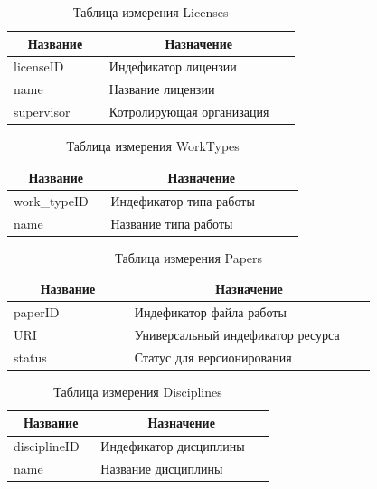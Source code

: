 \documentclass[a4paper,14pt]{extarticle}
\newcommand{\heading}[1]{\multicolumn{1}{|c|}{\textbf{#1}}}
\begin{document}
\begin{table}[htbp]
	\caption{Таблица измерения Licenses}
	\begin{tabular}{|p{0.3\linewidth}|p{0.6\linewidth}|}
		\hline
		\heading{Название} & \heading{Назначение} \\ \hline
		licenseID & Индефикатор лицензии \\ \hline
		name & Название лицензии \\ \hline
		supervisor & Котролирующая организация \\ \hline
	\end{tabular}
	\label{tab:licenses}
\end{table}


\begin{table}[htbp]
\caption{Таблица измерения WorkTypes}
\begin{tabular}{|p{0.3\linewidth}|p{0.6\linewidth}|}
	\hline
	\heading{Название} & \heading{Назначение} \\ \hline
		work\_typeID & Индефикатор типа работы \\ \hline
		name & Название типа работы \\ \hline
	\end{tabular}
	\label{tab:worktypes}
\end{table}

\begin{table}[htbp]
	\caption{Таблица измерения Papers}
	\begin{tabular}{|p{0.3\linewidth}|p{0.6\linewidth}|}
		\hline
		\heading{Название} & \heading{Назначение} \\ \hline
		paperID & Индефикатор файла работы \\ \hline
		URI & Универсальный индефикатор ресурса \\ \hline
		status & Статус для версионирования \\ \hline
	\end{tabular}
	\label{tab:papers}
\end{table}

\begin{table}[htbp]
	\caption{Таблица измерения Disciplines}
	\begin{tabular}{|p{0.3\linewidth}|p{0.6\linewidth}|}
		\hline
		\heading{Название} & \heading{Назначение} \\ \hline
		disciplineID & Индефикатор дисциплины  \\ \hline
		name & Название дисциплины \\ \hline
	\end{tabular}
	\label{tab:disciplines}
\end{table}
\end{document}
